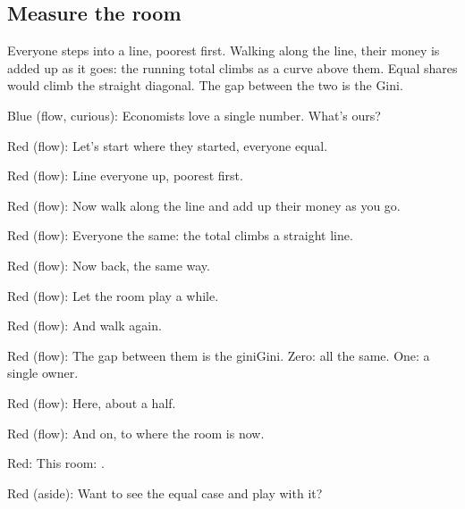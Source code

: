 \subsection{Measure the room}\label{act:gini}

\label{gini}

Everyone steps into a line, poorest first. Walking along the line, their
money is added up as it goes: the running total climbs as a curve above
them. Equal shares would climb the straight diagonal. The gap between the
two is the Gini.

Blue (flow, curious): Economists love a single number.
What's ours?

Red (flow): Let's start where they started,
everyone equal.

Red (flow): Line everyone up, poorest first.

Red (flow): Now walk along the line
and add up their money as you go.

Red (flow): Everyone the same:
the total climbs a straight line.

Red (flow): Now back, the same way.

Red (flow): Let the room play a while.

Red (flow): And walk again.

Red (flow): The gap between them is the \gls{gini}{Gini}.
Zero: all the same. One: a single owner.

Red (flow): Here, about a half.

Red (flow): And on, to where the room is now.

Red: This room: .


Red (aside): Want to see the equal case
and play with it?



